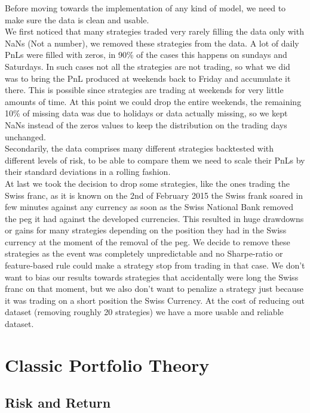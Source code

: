 \documentclass[12pt]{article} %
\numberwithin{equation}{subsection}
\begin{document}
Before moving towards the implementation of any kind of model, we need to make sure the data is clean and usable.\\
We first noticed that many strategies traded very rarely filling the data only with NaNs (Not a number), we removed these strategies from the data. A lot of daily PnLs were filled with zeros, in 90\% of the cases this happens on sundays and Saturdays. In such cases not all the strategies are not trading, so what we did was to bring the PnL produced at weekends back to Friday and accumulate it there. This is possible since strategies are trading at weekends for very little amounts of time. At this point we could drop the entire weekends, the remaining 10\% of missing data was due to holidays or data actually missing, so we kept NaNs instead of the zeros values to keep the distribution on the trading days unchanged.\\  
Secondarily, the data comprises many different strategies backtested with different levels of risk, to be able to compare them we need to scale their PnLs by their standard deviations in a rolling fashion.\\
At last we took the decision to drop some strategies, like the ones trading the Swiss franc, as it is known on the 2nd of February 2015 the Swiss frank soared in few minutes against any currency as soon as the Swiss National Bank removed the peg it had against the developed currencies. This resulted in huge drawdowns or gains for many strategies depending on the position they had in the Swiss currency at the moment of the removal of the peg. We decide to remove these strategies as the event was completely unpredictable and no Sharpe-ratio or feature-based rule could make a strategy stop from trading in that case. We don't want to bias our results towards strategies that accidentally were long the Swiss franc on that moment, but we also don't want to penalize a strategy just because it was trading on a short position the Swiss Currency. At the cost of reducing out dataset (removing roughly 20 strategies) we have a more usable and reliable dataset.

\section{Classic Portfolio Theory}

\subsection{Risk and Return}
\end{document}
